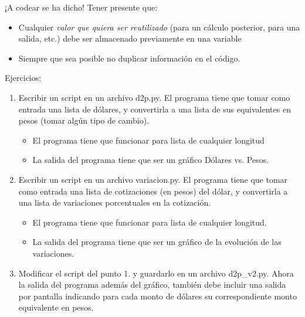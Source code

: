 \documentclass[9pt]{beamer}
\begin{document}
\begin{frame}{¡A codear se ha dicho!}
	Tener presente que:
	\begin{itemize}
		\item Cualquier \emph{valor que quiera ser reutilizado} (para un cálculo posterior, para una salida, etc.) \alert{debe ser almacenado previamente en una variable}
		\item Siempre que sea posible \alert{no duplicar información} en el código.
	\end{itemize}
\begin{block}{Ejercicios:}
	\begin{enumerate}
		\item Escribir un script en un archivo d2p.py. El programa tiene que tomar como entrada una lista de dólares, y convertirla a una lista de sus equivalentes en pesos (tomar algún tipo de cambio).
		\begin{itemize}
			\item El programa tiene que funcionar para lista de cualquier longitud
			\item La salida del programa tiene que ser un gráfico Dólares vs. Pesos.
		\end{itemize}
		\item Escribir un script en un archivo variacion.py. El programa tiene que tomar como entrada una lista de cotizaciones (en pesos) del dólar, y convertirla a una lista de variaciones porcentuales en la cotización.
		\begin{itemize}
			\item El programa tiene que funcionar para lista de cualquier longitud.
			\item La salida del programa tiene que ser un gráfico de la evolución de las variaciones.
		\end{itemize}
		\item Modificar el script del punto 1. y guardarlo en un archivo d2p\_v2.py. Ahora la salida del programa además del gráfico, también debe incluir una salida por pantalla indicando para cada monto de dólares su correspondiente monto equivalente en pesos. 
	\end{enumerate}
\end{block}

\end{frame}
\end{document}
